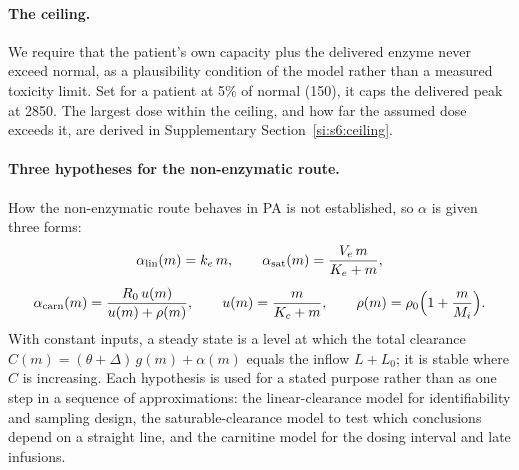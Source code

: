 \paragraph{The ceiling.} We require that the patient's own capacity plus the delivered
enzyme never exceed normal, as a plausibility condition of the model rather than a measured
toxicity limit. Set for a patient at 5\% of normal (150\um), it caps the delivered peak at
2850\um. The largest dose within the ceiling, and how far the assumed dose exceeds it, are
derived in Supplementary Section~\ref{si:s6:ceiling}.

\paragraph{Three hypotheses for the non-enzymatic route.} How the non-enzymatic route
behaves in PA is not established, so $\alpha$ is given three forms:
\begin{equation}
\label{seq:s1-alphas}
\begin{gathered}
\alpha_{\mathrm{lin}}(m)=k_e\,m,\qquad
\alpha_{\mathrm{sat}}(m)=\frac{V_e\,m}{K_e+m},\\[4pt]
\alpha_{\mathrm{carn}}(m)=\frac{R_0\,u(m)}{u(m)+\rho(m)},\qquad
u(m)=\frac{m}{K_c+m},\qquad \rho(m)=\rho_0\Bigl(1+\frac{m}{M_i}\Bigr).
\end{gathered}
\end{equation}
With constant inputs, a steady state is a level at which the total clearance
$C(m)=(\theta+\Delta)\,g(m)+\alpha(m)$ equals the inflow $L+L_0$; it is stable where $C$ is
increasing. Each hypothesis is used for a stated purpose rather than as one step in a sequence
of approximations: the linear-clearance model for identifiability and sampling design, the
saturable-clearance model to test which conclusions depend on a straight line, and the
carnitine model for the dosing interval and late infusions.

